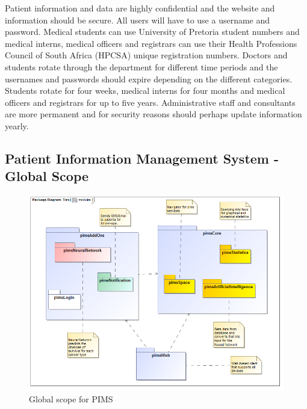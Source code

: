 Patient  information  and  data  are  highly  confidential  and  the  website  and 
information  should  be  secure.  All  users  will  have  to  use  a  username  and 
password. Medical students can use University of Pretoria student numbers and 
medical interns, medical officers and registrars can use their Health Professions 
Council  of  South  Africa  (HPCSA)  unique  registration  numbers.  Doctors  and 
students  rotate  through  the  department  for  different  time  periods  and  the 
usernames and passwords should expire depending on the different categories. 
Students  rotate  for  four  weeks,  medical  interns  for  four  months  and medical 
officers and registrars  for  up  to  five  years.  Administrative  staff  and  consultants 
are more permanent and for security reasons should perhaps update information 
yearly. \par


\subsection{Patient Information Management System - Global Scope}
\begin{figure}[H]
	\centerline{\includegraphics[width=\linewidth]{./Graphics/globalImages/modules}}
	\caption{Global scope for PIMS}
\end{figure}
